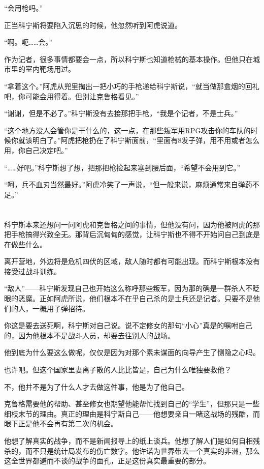 “会用枪吗。”

正当科宁斯将要陷入沉思的时候，他忽然听到阿虎说道。

“啊。呃……会。”

作为记者，很多事情都要会一点，所以科宁斯也知道枪械的基本操作。但他只在城市里的室内靶场用过。

“拿着这个。”阿虎从兜里掏出一把小巧的手枪递给科宁斯说，“就当做那盒烟的回礼吧，你可能会用得着。但别让克鲁格看见。”

“谢谢，但是不必了。”科宁斯没有去接那把手枪，“我是个记者，不是士兵。”

“这个地方没人会管你是干什么的，这一点，在那些叛军用RPG攻击你的车队的时候你就该明白了。”阿虎把枪扔在了科宁斯面前，“里面有8发子弹，用不用或者怎么用，你自己决定吧。”

“……好吧。”科宁斯想了想，把那把枪捡起来塞到腰后面，“希望不会用到它。”

“呵，兵不血刃当然最好。”阿虎冷笑了一声说，“但一般来说，麻烦通常来自弹药不足。”

\section*{}

科宁斯本来还想问一问阿虎和克鲁格之间的事情，但他没有问，因为他被阿虎的那把手枪搞得兴致全无。那背后沉甸甸的感觉，让科宁斯也不得不开始问自己到底是在做些什么。

离开营地，外边将是危机四伏的区域，敌人随时都有可能出现。而科宁斯根本没有接受过战斗训练。

“敌人”——科宁斯发现自己也开始这么称呼那些叛军，因为那的确是一群杀人不眨眼的恶魔。正如阿虎所说，他们根本不在乎自己杀的是士兵还是记者。只要不是他们的人，一概用子弹招待。

你这是要去送死啊，科宁斯对自己说。说不定修女的那句“小心”真是的嘱咐自己的，因为他根本不是战斗人员，却要去往别人的战场。

他到底为什么要这么做呢，仅仅是因为对那个素未谋面的向导产生了恻隐之心吗。

也许吧。但这个国家里妻离子散的人比比皆是，自己为什么唯独要救他？

不，他并不是为了什么人才去做这件事，他是为了他自己。

克鲁格需要他的帮助、甚至修女也期望他能帮忙找到自己的“学生”，但那只是一些细枝末节的理由。真正的理由是科宁斯自己——他想要亲自一睹这战场的残酷，而眼下正是他不会再有第二次的机会。

他想了解真实的战争，而不是新闻报导上的纸上谈兵。他想了解人们是如何自相残杀的，而不只是统计局发布的伤亡数字。他许诺为世界带去一个真实的非洲，那么这全世界都避而不谈的战争的面孔，正是这份真实最重要的部分。


